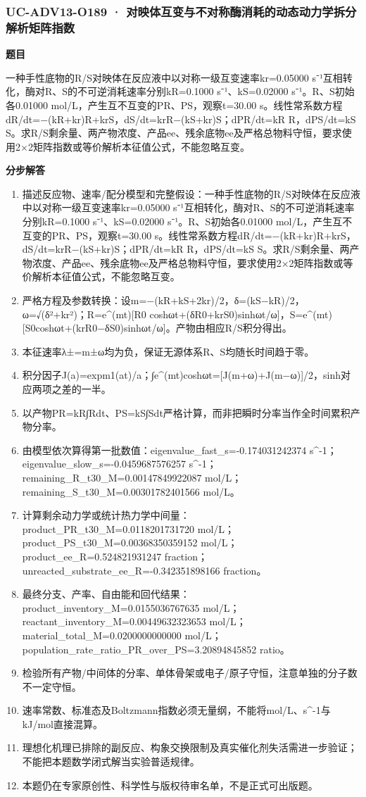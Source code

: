 \documentclass[UTF8,11pt,a4paper]{ctexart}
\begin{document}
\subsubsection*{UC-ADV13-O189 · 对映体互变与不对称酶消耗的动态动力学拆分解析矩阵指数}
\noindent\textbf{题目}\par
一种手性底物的R/S对映体在反应液中以对称一级互变速率kr=0.05000 s⁻¹互相转化，酶对R、S的不可逆消耗速率分别kR=0.1000 s⁻¹、kS=0.02000 s⁻¹。R、S初始各0.01000 mol/L，产生互不互变的PR、PS，观察t=30.00 s。线性常系数方程dR/dt=−(kR+kr)R+krS，dS/dt=krR−(kS+kr)S；dPR/dt=kR R，dPS/dt=kS S。求R/S剩余量、两产物浓度、产品ee、残余底物ee及严格总物料守恒，要求使用2×2矩阵指数或等价解析本征值公式，不能忽略互变。\par
\medskip\noindent\textbf{分步解答}
\begin{enumerate}
\item 描述反应物、速率/配分模型和完整假设：一种手性底物的R/S对映体在反应液中以对称一级互变速率kr=0.05000 s⁻¹互相转化，酶对R、S的不可逆消耗速率分别kR=0.1000 s⁻¹、kS=0.02000 s⁻¹。R、S初始各0.01000 mol/L，产生互不互变的PR、PS，观察t=30.00 s。线性常系数方程dR/dt=−(kR+kr)R+krS，dS/dt=krR−(kS+kr)S；dPR/dt=kR R，dPS/dt=kS S。求R/S剩余量、两产物浓度、产品ee、残余底物ee及严格总物料守恒，要求使用2×2矩阵指数或等价解析本征值公式，不能忽略互变。
\item 严格方程及参数转换：设m=−(kR+kS+2kr)/2，δ=(kS−kR)/2，ω=√(δ²+kr²)；R=e\textasciicircum{}(mt)[R0 coshωt+(δR0+krS0)sinhωt/ω]，S=e\textasciicircum{}(mt)[S0coshωt+(krR0−δS0)sinhωt/ω]。产物由相应R/S积分得出。
\item 本征速率λ±=m±ω均为负，保证无源体系R、S均随长时间趋于零。
\item 积分因子J(a)=expm1(at)/a；∫e\textasciicircum{}(mt)coshωt=[J(m+ω)+J(m−ω)]/2，sinh对应两项之差的一半。
\item 以产物PR=kR∫Rdt、PS=kS∫Sdt严格计算，而非把瞬时分率当作全时间累积产物分率。
\item 由模型依次算得第一批数值：eigenvalue\_fast\_s=-0.174031242374 s\textasciicircum{}-1；eigenvalue\_slow\_s=-0.0459687576257 s\textasciicircum{}-1；remaining\_R\_t30\_M=0.00147849922087 mol/L；remaining\_S\_t30\_M=0.00301782401566 mol/L。
\item 计算剩余动力学或统计热力学中间量：product\_PR\_t30\_M=0.0118201731720 mol/L；product\_PS\_t30\_M=0.00368350359152 mol/L；product\_ee\_R=0.524821931247 fraction；unreacted\_substrate\_ee\_R=-0.342351898166 fraction。
\item 最终分支、产率、自由能和回代结果：product\_inventory\_M=0.0155036767635 mol/L；reactant\_inventory\_M=0.00449632323653 mol/L；material\_total\_M=0.0200000000000 mol/L；population\_rate\_ratio\_PR\_over\_PS=3.20894845852 ratio。
\item 检验所有产物/中间体的分率、单体骨架或电子/原子守恒，注意单独的分子数不一定守恒。
\item 速率常数、标准态及Boltzmann指数必须无量纲，不能将mol/L、s\textasciicircum{}-1与kJ/mol直接混算。
\item 理想化机理已排除的副反应、构象交换限制及真实催化剂失活需进一步验证；不能把本题数学闭式解当实验普适规律。
\item 本题仍在专家原创性、科学性与版权待审名单，不是正式可出版题。
\end{enumerate}
\end{document}
